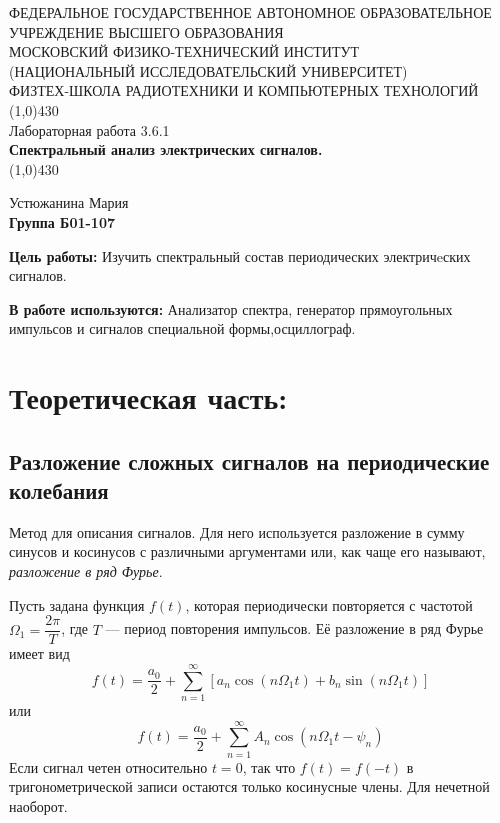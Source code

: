 \documentclass[11pt]{article}
\begin{document}
\begin{titlepage}
\begin{center}
\large{\small ФЕДЕРАЛЬНОЕ ГОСУДАРСТВЕННОЕ АВТОНОМНОЕ ОБРАЗОВАТЕЛЬНОЕ\\ УЧРЕЖДЕНИЕ ВЫСШЕГО ОБРАЗОВАНИЯ\\ МОСКОВСКИЙ ФИЗИКО-ТЕХНИЧЕСКИЙ ИНСТИТУТ\\ (НАЦИОНАЛЬНЫЙ ИССЛЕДОВАТЕЛЬСКИЙ УНИВЕРСИТЕТ)\\ ФИЗТЕХ-ШКОЛА РАДИОТЕХНИКИ И КОМПЬЮТЕРНЫХ ТЕХНОЛОГИЙ}
\vfill
\line(1,0){430}\\[1mm]
\huge{Лабораторная работа 3.6.1}\\
\huge\textbf{Спектральный анализ электрических сигналов.}\\
\line(1,0){430}\\[1mm]
\vfill
\begin{flushright}
\normalsize{Устюжанина Мария}\\
\normalsize{\textbf{Группа Б01-107}}\\
\end{flushright}
\end{center}
\end{titlepage}

\par \textbf{Цель работы:} Изучить спектральный состав периодических электричeских сигналов.

\par \textbf{В работе используются:} Анализатор спектра, генератор прямоугольных импульсов и сигналов специальной формы,осциллограф.

\section{Теоретическая часть:}

\subsection*{Разложение сложных сигналов на периодические колебания}
Метод для описания сигналов. Для него используется разложение в сумму синусов и косинусов с различными аргументами или, как чаще его называют, \textit{разложение в ряд Фурье}.

Пусть задана функция $f(t)$, которая периодически повторяется с частотой $\Omega_1 = \dfrac{2\pi}{T}$, где $T$ --- период повторения импульсов. Её разложение в ряд Фурье имеет вид 
\begin{equation}
f(t) = \dfrac{a_0}{2} + \sum\limits_{n = 1}^{\infty}\left[a_n \cos \left(n \Omega_1t\right) + b_n \sin \left(n \Omega_1t\right)\right]
\end{equation}
или
\begin{equation}
f(t) = \dfrac{a_0}{2} + \sum\limits_{n = 1}^{\infty}A_n \cos \left(n\Omega_1t-\psi_n\right)
\end{equation}
Если сигнал четен относительно $t=0$, так что $f(t) = f(-t)$ в тригонометрической записи остаются только косинусные члены. Для нечетной наоборот.
\end{document}
